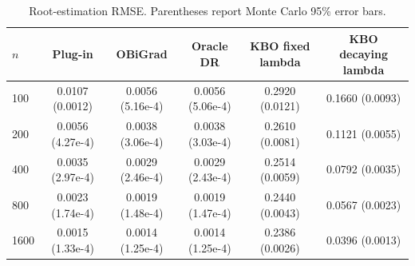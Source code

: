 \begin{table}[t]
\centering
\small
\setlength{\tabcolsep}{5pt}
\caption{Root-estimation RMSE. Parentheses report Monte Carlo 95\% error bars.}
\label{tab:generated-iv-root-rmse}
\begin{tabular}{lccccc}
\toprule
$n$ & Plug-in & OBiGrad & Oracle DR & KBO fixed lambda & KBO decaying lambda \\
\midrule
100 & 0.0107 (0.0012) & 0.0056 (5.16e-4) & 0.0056 (5.06e-4) & 0.2920 (0.0121) & 0.1660 (0.0093) \\
200 & 0.0056 (4.27e-4) & 0.0038 (3.06e-4) & 0.0038 (3.03e-4) & 0.2610 (0.0081) & 0.1121 (0.0055) \\
400 & 0.0035 (2.97e-4) & 0.0029 (2.46e-4) & 0.0029 (2.43e-4) & 0.2514 (0.0059) & 0.0792 (0.0035) \\
800 & 0.0023 (1.74e-4) & 0.0019 (1.48e-4) & 0.0019 (1.47e-4) & 0.2440 (0.0043) & 0.0567 (0.0023) \\
1600 & 0.0015 (1.33e-4) & 0.0014 (1.25e-4) & 0.0014 (1.25e-4) & 0.2386 (0.0026) & 0.0396 (0.0013) \\
\bottomrule
\end{tabular}
\end{table}
